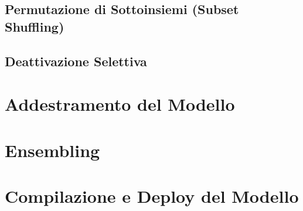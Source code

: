 \subsection{Permutazione di Sottoinsiemi (Subset Shuffling)}
\subsection{Deattivazione Selettiva}
\section{Addestramento del Modello}
\section{Ensembling}
\section{Compilazione e Deploy del Modello}


